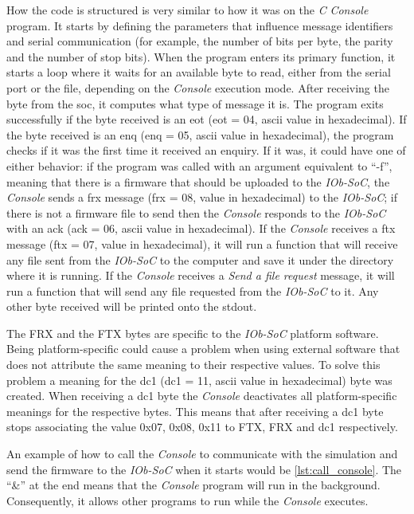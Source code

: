 How the code is structured is very similar to how it was on the \textit{C} \textit{Console} program. It starts by defining the parameters that influence message identifiers and serial communication (for example, the number of bits per byte, the parity and the number of stop bits). When the program enters its primary function, it starts a loop where it waits for an available byte to read, either from the serial port or the file, depending on the \textit{Console} execution mode. After receiving the byte from the \acrshort{soc}, it computes what type of message it is. The program exits successfully if the byte received is an \acrlong{eot} (\acrshort{eot} = 04, \acrshort{ascii} value in hexadecimal). If the byte received is an \acrlong{enq} (\acrshort{enq} = 05, \acrshort{ascii} value in hexadecimal), the program checks if it was the first time it received an enquiry. If it was, it could have one of either behavior: if the program was called with an argument equivalent to \enquote{-f}, meaning that there is a firmware that should be uploaded to the \textit{IOb-SoC}, the \textit{Console} sends a \acrlong{frx} message (\acrshort{frx} = 08, value in hexadecimal) to the \textit{IOb-SoC}; if there is not a firmware file to send then the \textit{Console} responds to the \textit{IOb-SoC} with an \acrlong{ack} (\acrshort{ack} = 06, \acrshort{ascii} value in hexadecimal). If the \textit{Console} receives a \acrlong{ftx} message (\acrshort{ftx} = 07, value in hexadecimal), it will run a function that will receive any file sent from the \textit{IOb-SoC} to the computer and save it under the directory where it is running. If the \textit{Console} receives a \textit{Send a file request} message, it will run a function that will send any file requested from the \textit{IOb-SoC} to it. Any other byte received will be printed onto the stdout.

The FRX and the FTX bytes are specific to the \textit{IOb-SoC} platform software. Being platform-specific could cause a problem when using external software that does not attribute the same meaning to their respective values. To solve this problem a meaning for the \acrlong{dc1} (\acrshort{dc1} = 11, \acrshort{ascii} value in hexadecimal) byte was created. When receiving a \acrshort{dc1} byte the \textit{Console} deactivates all platform-specific meanings for the respective bytes. This means that after receiving a \acrshort{dc1} byte stops associating the value 0x07, 0x08, 0x11 to FTX, FRX and \acrshort{dc1} respectively.

An example of how to call the \textit{Console} to communicate with the simulation and send the firmware to the \textit{IOb-SoC} when it starts would be \ref{lst:call_console}. The \enquote{\&} at the end means that the \textit{Console} program will run in the background. Consequently, it allows other programs to run while the \textit{Console} executes.

